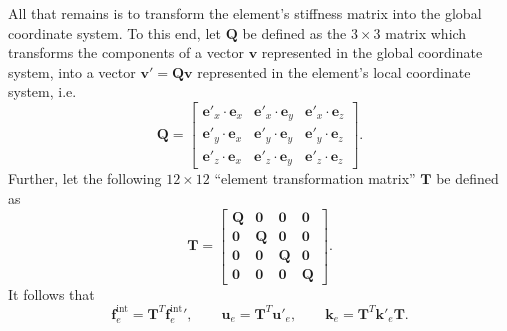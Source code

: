 \documentclass[12pt,a4paper,article]{memoir} %
\begin{document}
All that remains is to transform the element's stiffness matrix into the global coordinate system. To this end, let $\mathbf{Q}$ be defined as the $3\times3$ matrix which transforms the components of a vector $\mathbf{v}$ represented in the global coordinate system, into a vector $\mathbf{v}' = \mathbf{Q} \mathbf{v}$ represented in the element's local coordinate system, i.e.
\begin{equation}
  \mathbf{Q} = \left[ \begin{array}{ccc}
      \mathbf{e}'_x \cdot \mathbf{e}_x & \mathbf{e}'_x \cdot \mathbf{e}_y & \mathbf{e}'_x \cdot \mathbf{e}_z \\
      \mathbf{e}'_y \cdot \mathbf{e}_x & \mathbf{e}'_y \cdot \mathbf{e}_y & \mathbf{e}'_y \cdot \mathbf{e}_z \\
      \mathbf{e}'_z \cdot \mathbf{e}_x & \mathbf{e}'_z \cdot \mathbf{e}_y & \mathbf{e}'_z \cdot \mathbf{e}_z \end{array} \right].
\end{equation}
Further, let the following $12 \times 12$ ``element transformation matrix'' $\mathbf{T}$ be defined as
\begin{equation}
  \mathbf{T} = \left[ \begin{array}{cccc}
      \mathbf{Q} & \mathbf{0} & \mathbf{0} & \mathbf{0} \\
      \mathbf{0} & \mathbf{Q} & \mathbf{0} & \mathbf{0} \\
      \mathbf{0} & \mathbf{0} & \mathbf{Q} & \mathbf{0} \\
      \mathbf{0} & \mathbf{0} & \mathbf{0} & \mathbf{Q} \end{array} \right].
\end{equation}
It follows that
\begin{equation}
  {\mathbf{f}_e^{\text{int}}} = \mathbf{T}^T {\mathbf{f}_e^{\text{int}}}', \qquad \mathbf{u}_e = \mathbf{T}^T \mathbf{u}'_e, \qquad \mathbf{k}_e = \mathbf{T}^T \mathbf{k}'_e \mathbf{T}.
\end{equation}




\end{document}
